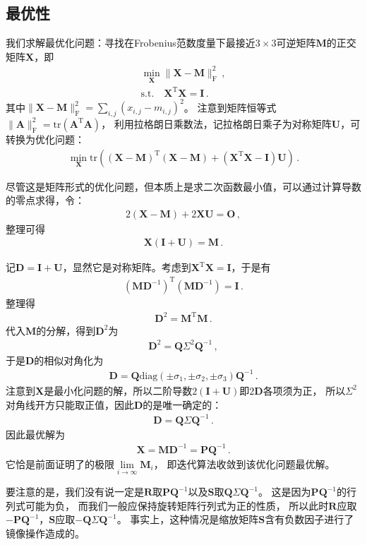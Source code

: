 \subsection{最优性}\label{sub:最优性02ex02}
\begin{prove}
    我们求解最优化问题：寻找在Frobenius范数度量下最接近$3\times3$可逆矩阵$\bm M$的正交矩阵$\bm X$，即
    \begin{align}
        \min\limits_{\bm X}{\|\bm X-\bm M\|_{\mathrm{F}}^2}\, , \\
        \mathrm{s.t.}\quad \bm X^{\mathrm{T}}\bm X=\bm I\, .
    \end{align}
    其中$\displaystyle\|\bm X-\bm M\|_{\mathrm{F}}^2=\sum\limits_{i,j}{(x_{i,j}-m_{i,j})^2}$。
    注意到矩阵恒等式$\|\bm A\|_{\mathrm{F}}^2=\mathrm{tr}(\bm A^{\mathrm{T}}\bm A)$，
    利用拉格朗日乘数法，记拉格朗日乘子为对称矩阵$\bm U$，可转换为优化问题：
    \begin{align}
        \min\limits_{\bm X}{\mathrm{tr}((\bm X-\bm M)^{\mathrm{T}}(\bm X-\bm M)+(\bm X^{\mathrm{T}}\bm X-\bm I)\bm U)}\, .
    \end{align}

    尽管这是矩阵形式的优化问题，但本质上是求二次函数最小值，可以通过计算导数的零点求得，令：
    \begin{align}
        2(\bm X-\bm M)+2\bm X\bm U=\bm O\, ,
    \end{align}
    整理可得
    \begin{align}
        \bm X(\bm I+\bm U)=\bm M\, .
    \end{align}

    记$\bm D=\bm I+\bm U$，显然它是对称矩阵。考虑到$\bm X^{\mathrm{T}}\bm X=\bm I$，于是有
    \begin{align}
        (\bm M\bm D^{-1})^{\mathrm{T}}(\bm M\bm D^{-1})=\bm I\, .
    \end{align}
    整理得
    \begin{align}
        \bm D^2=\bm M^{\mathrm{T}}\bm M\, .
    \end{align}
    代入$\bm M$的分解，得到$\bm D^2$为
    \begin{align}
        \bm D^2=\bm Q\varSigma^2\bm Q^{-1}\, ,
    \end{align}
    于是$\bm D$的相似对角化为
    \begin{align}
        \bm D=\bm Q\mathrm{diag}(\pm\sigma_1,\pm\sigma_2,\pm\sigma_3)\bm Q^{-1}\, .
    \end{align}
    注意到$\bm X$是最小化问题的解，所以二阶导数$2(\bm I+\bm U)$即$2\bm D$各项须为正，
    所以$\varSigma^2$对角线开方只能取正值，因此$\bm D$的是唯一确定的：
    \begin{align}
        \bm D=\bm Q\varSigma\bm Q^{-1}\, .
    \end{align}
    因此最优解为
    \begin{align}
        \bm X=\bm M\bm D^{-1}=\bm P\bm Q^{-1}\, .
    \end{align}
    它恰是前面证明了的极限$\lim\limits_{i\rightarrow\infty}\bm M_i$，
    即迭代算法收敛到该优化问题最优解。
\end{prove}

要注意的是，我们没有说一定是$\bm R$取$\bm P\bm Q^{-1}$以及$\bm S$取$\bm Q\varSigma\bm Q^{-1}$。
这是因为$\bm P\bm Q^{-1}$的行列式可能为负，
而我们一般应保持旋转矩阵行列式为正的性质，
所以此时$\bm R$应取$-\bm P\bm Q^{-1}$，$\bm S$应取$-\bm Q\varSigma\bm Q^{-1}$。
事实上，这种情况是缩放矩阵$\bm S$含有负数因子进行了镜像操作造成的。